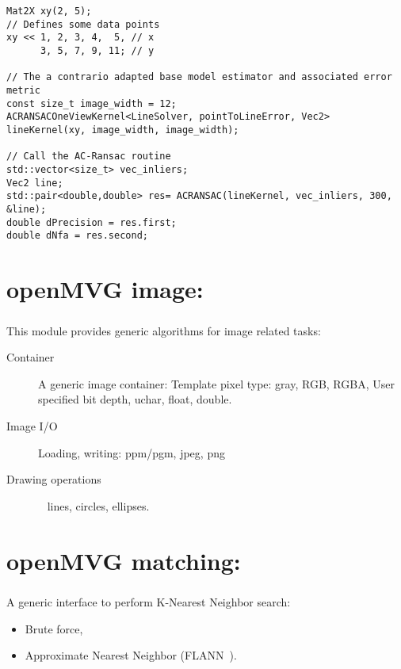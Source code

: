 \documentclass[11pt, letterpaper]{report}
\begin{document}
\vspace{-.5cm}
\begin{lstlisting}
Mat2X xy(2, 5);
// Defines some data points
xy << 1, 2, 3, 4,  5, // x 
      3, 5, 7, 9, 11; // y

// The a contrario adapted base model estimator and associated error metric
const size_t image_width = 12;
ACRANSACOneViewKernel<LineSolver, pointToLineError, Vec2> lineKernel(xy, image_width, image_width);

// Call the AC-Ransac routine
std::vector<size_t> vec_inliers;
Vec2 line;
std::pair<double,double> res= ACRANSAC(lineKernel, vec_inliers, 300, &line);
double dPrecision = res.first;
double dNfa = res.second;
\end{lstlisting}

\newpage
\chapter{openMVG image:}
\paragraph{}
This module provides generic algorithms for image related tasks:
\begin{description}
\item[Container] A generic image container:
\subitem Template pixel type: gray, RGB, RGBA,
\subitem User specified bit depth, uchar, float, double.
\item[Image I/O] Loading, writing:
\subitem ppm/pgm, jpeg, png
\item[Drawing operations] ~
\subitem lines,
\subitem circles,
\subitem ellipses.
\end{description}

\newpage
\chapter{openMVG matching:}
\paragraph{}
A generic interface to perform K-Nearest Neighbor search:
\begin{itemize}
\item Brute force,
\item Approximate Nearest Neighbor (FLANN~\cite{muja_flann_2009}).
\end{itemize}
\end{document}
